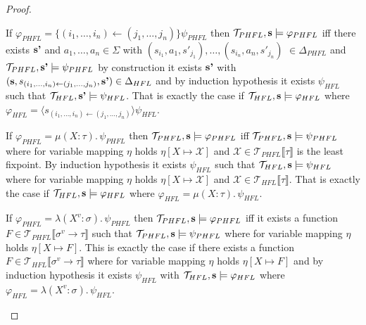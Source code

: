 \begin{proof}
\begin{compactitem}
        \item If $\varphi_{PHFL} = \{(i_1, \dots, i_n) \leftarrow (j_1, \dots, j_n)\} \psi_{PHFL}$ then
        $\mathcal{T}_{PHFL}, \emph{s} \models \varphi_{PHFL}$ iff there exists $\emph{s'}$ and $a_1,
        \dots, a_n \in \Sigma$ with $(s_{i_1}, a_1, {s'}_{j_1}), \dots, (s_{i_n}, a_n, {s'}_{j_n})$ $ \in \Delta_{PHFL}$
        and $\mathcal{T}_{PHFL}, \emph{s'} \models \psi_{PHFL}$ by construction it exists $\emph{s'}$ with $
        (\emph{s}, s_{(i_1, \dots, i_n) \leftarrow (j_1, \dots, j_n)}, \emph{s'}) \in \Delta_{HFL}$ and by induction
        hypothesis it exists $\psi_{HFL}$ such that $\mathcal{T}_{HFL}, \emph{s'} \models \psi_{HFL}$. That is
        exactly the case if $\mathcal{T}_{HFL}, \emph{s} \models \varphi_{HFL}$ where $\varphi_{HFL} = \langle s_{
        (i_1, \dots, i_n) \leftarrow (j_1, \dots, j_n)} \rangle \psi_{HFL}$.

        \item If $\varphi_{PHFL} = \mu(X \colon \tau).\,\psi_{PHFL}$ then $\mathcal{T}_{PHFL}, \emph{s}
        \models \varphi_{PHFL}$ iff $\mathcal{T}_{PHFL}, \emph{s} \models \psi_{PHFL}$ where for variable mapping
        $\eta$ holds $\eta[X \mapsto \mathcal{X}]$ and $\mathcal{X} \in \mathcal{T}_{PHFL} \llbracket \tau
        \rrbracket$ is the least fixpoint. By induction hypothesis it exists $\psi_{HFL}$ such that
        $\mathcal{T}_{HFL}, \emph{s} \models \psi_{HFL}$ where for variable mapping $\eta$ holds $\eta[X \mapsto
        \mathcal{X}]$ and $\mathcal{X} \in \mathcal{T}_{HFL} \llbracket \tau \rrbracket$. That is exactly the case if
        $\mathcal{T}_{HFL}, \emph{s} \models \varphi_{HFL}$ where $\varphi_{HFL} = \mu(X \colon \tau).\,\psi_{HFL}$.

        \item If $\varphi_{PHFL} = \lambda (X^v \colon \sigma).\,\psi_{PHFL}$ then $\mathcal{T}_{PHFL}, \emph{s}
        \models \varphi_{PHFL}$ iff it exists a function $F \in \mathcal{T}_{PHFL}\llbracket \sigma^v \rightarrow \tau
        \rrbracket$ such that $\mathcal{T}_{PHFL}, \emph{s} \models \psi_{PHFL}$ where for variable mapping $\eta$
        holds $\eta[X \mapsto F]$. This is exactly the case if there exists a function $F \in
        \mathcal{T}_{HFL}\llbracket \sigma^v \rightarrow \tau \rrbracket$ where for variable mapping $\eta$ holds
        $\eta[X \mapsto F]$ and by induction hypothesis it exists $\psi_{HFL}$ with $\mathcal{T}_{HFL}, \emph{s}
        \models \varphi_{HFL}$ where $\varphi_{HFL} = \lambda (X^v \colon \sigma).\,\psi_{HFL}$.


\end{compactitem}
\end{proof}
